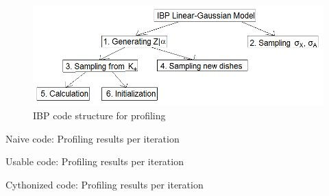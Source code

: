 
\begin{figure}[!ht]
\centering
    \includegraphics[width=\linewidth]{IBP_profiling.png}
    \caption{IBP code structure for profiling}
    \label{fig:profiling}
\end{figure}

\begin{table}[!ht]
  \centering
  
  \caption{Naive code: Profiling results per iteration}
  \label{tab:naive}
\end{table}

\begin{table}[!ht]
  \centering
  
  \caption{Usable code: Profiling results per iteration}
  \label{tab:usable}
\end{table}

\begin{table}[!ht]
  \centering
  
  \caption{Cythonized code: Profiling results per iteration}
  \label{tab:cythonized}
\end{table}